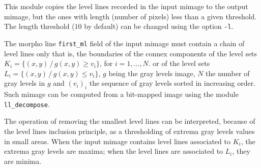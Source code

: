 This module copies the level lines recorded in the 
input mimage to the output mimage, but the ones with length (number of pixels)
less than a given threshold. 
The length threshold ($10$ by default) can be changed using the option
\verb+-l+.

The morpho line \verb+first_ml+ field of the input mimage must contain a
chain of level lines only that is, the boundaries of the connex components 
of the level sets 
$K_i=\{ (x,y)\,/\, g(x,y)\geq v_i\}$, for $i=1,\ldots,N$.
or of the level sets
$L_i=\{ (x,y)\,/\, g(x,y)\leq v_i\}$,
$g$ being the gray levels image, $N$ the number of gray levels in $g$
and $(v_i)_i$ the sequence of gray levels sorted in increasing order.
Such mimage can be computed from a bit-mapped image using the module
\verb+ll_decompose+.

The operation of removing the smallest level lines can be interpreted, because
of the level lines inclusion principle, as a thresholding of extrema gray
levels values in small areas.
When the input mimage contains level lines associated to $K_i$, the extrema
gray levels are maxima; when the level lines are associated to $L_i$, they
are minima.
